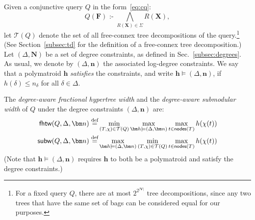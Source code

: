 \documentclass{theoretics}
\newcommand{\calT}{\mathcal T}
\newcommand{\defeq}{\stackrel{\text{def}}{=}}
\newcommand{\cd}{\text{ :- }}
\newcommand{\nodes}{\text{\sf nodes}}
\newcommand{\fhtw}{\textsf{fhtw}}
\newcommand{\subm}{\textsf{subw}}
\begin{document}
Given a conjunctive query $Q$ in the form~\eqref{eq:cq}:
\[ Q(\bm F) \cd  \bigwedge_{R(\bm X)\in \Sigma}R(\bm X), \]
let $\calT(Q)$ denote the set of all free-connex tree decompositions of the query.\footnote{
For a fixed query $Q$, there are at most $2^{2^{|\bm V|}}$ tree decompositions,
since any two trees that have the same set of bags can be considered
equal for our purposes.}
(See Section~\ref{subsec:td} for the definition of a free-connex tree decomposition.)
Let $(\Delta,\bm N)$ be a set of degree constraints, as defined in
Sec.~\ref{subsec:degrees}. As usual, we denote by $(\Delta, \bm n)$
the associated log-degree constraints.  We say that a polymatroid
$\bm h$ {\em satisfies} the constraints, and write
$\bm h \models (\Delta, \bm n)$, if $h(\delta) \leq n_\delta$ for all
$\delta \in \Delta$.

\begin{definition} \label{def:subw} The {\em degree-aware fractional
    hypertree width} and the {\em degree-aware submodular width} of
  $Q$ under the degree constraints $(\Delta, \bm n)$ are:
  \begin{align}
    \fhtw(Q,\Delta,\bm n) \defeq & \min_{(T,\chi)\in \calT(Q)} \max_{\bm h\models(\Delta,\bm n)} \max_{t \in \nodes(T)}h(\chi(t)) \label{eq:fhtw} \\
    \subm(Q,\Delta,\bm n) \defeq & \max_{\bm h\models(\Delta,\bm n)} \min_{(T,\chi)\in \calT(Q)} \max_{t \in \nodes(T)}h(\chi(t)) \label{eq:subm}
  \end{align}
(Note that $\bm h \models (\Delta,\bm n)$ requires $\bm h$ to both be a polymatroid
and satisfy the degree constraints.)
\end{definition}
%
\end{document}
